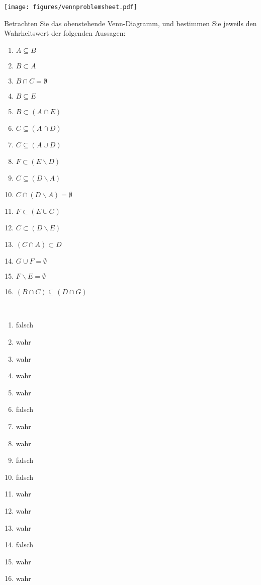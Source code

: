 \documentclass[12pt]{exam}
\begin{document}
\begin{questions}

\begin{center}
	\texttt{[image: figures/vennproblemsheet.pdf]}
\end{center}

Betrachten Sie das obenstehende Venn-Diagramm, und bestimmen Sie jeweils den Wahrheitswert der folgenden Aussagen:\\
\parbox{0.5\textwidth}{
	\begin{enumerate}
		\item $A\subseteq B$
		\item $B\subset A$
		\item $B\cap C=\emptyset$
		\item $B\subseteq E$
		\item $B\subset(A\cap E)$
		\item $C\subseteq(A\cap D)$
		\item $C\subseteq(A\cup D)$
		\item $F\subset(E\backslash D)$
\end{enumerate}}\parbox{0.5\textwidth}{
	\begin{enumerate}\setcounter{enumi}{8}
		\item $C\subseteq(D\backslash A)$
		\item $C\cap(D\backslash A)=\emptyset$
		\item $F\subset(E\cup G)$
		\item $C\subset(D\backslash E)$
		\item $(C\cap A)\subset D$
		\item $G\cup F=\emptyset$
		\item $F\backslash E=\emptyset$
		\item $(B\cap C)\subseteq (D\cap G)$
\end{enumerate}}
\begin{solution}\\
	\parbox{0.5\textwidth}{
		\begin{enumerate}
			\item falsch
			\item wahr
			\item wahr
			\item wahr
			\item wahr
			\item falsch
			\item wahr
			\item wahr
	\end{enumerate}}\parbox{0.5\textwidth}{
		\begin{enumerate}\setcounter{enumi}{8}
			\item falsch
			\item falsch
			\item wahr
			\item wahr
			\item wahr
			\item falsch
			\item wahr
			\item wahr
	\end{enumerate}}
\end{solution}




\end{questions}
\end{document}
